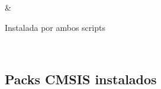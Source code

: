 \documentclass[letterpaper,10pt,english]{sphinxmanual}
\begin{document}
\begin{savenotes}
\begin{tabular}[t]{}
\begin{varwidth}[t]{}
\sphinxAtStartPar
{}
\sphinxbeforeendvarwidth
\end{varwidth}%
&\begin{varwidth}[t]{}
\sphinxAtStartPar
Instalada por ambos scripts
\sphinxbeforeendvarwidth
\end{varwidth}%
\\
\sphinxbottomrule
\end{tabular}
\sphinxtableafterendhook\par
\sphinxattableend\end{savenotes}


\subsection{Packs CMSIS instalados}
\label{\detokenize{vscode:packs-cmsis-instalados}}
\end{document}
